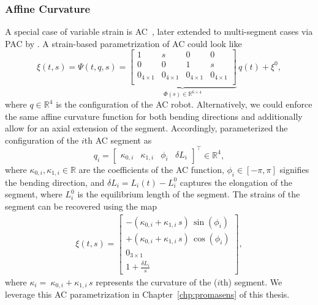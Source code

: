 \subsubsection{Affine Curvature}
A special case of variable strain is \gls{AC}~\citep{della2020soft, stella2022experimental, tiburzio2025model}, later extended to multi-segment cases via \gls{PAC} by \citet{stella2023piecewise}.
A strain-based parametrization of \gls{AC} could look like
\begin{equation}
    \xi(t,s) = \Psi(t,q,s) = \underbrace{\begin{bmatrix}
        1 & s & 0 & 0\\
        0 & 0 & 1 & s\\
        0_{4 \times 1} & 0_{4 \times 1} & 0_{4 \times 1} & 0_{4 \times 1}\\
    \end{bmatrix}}_{\Phi(s) \in \mathbb{R}^{6 \times 4}} \, q(t) + \xi^0,
\end{equation}
where $q \in \mathbb{R}^4$ is the configuration of the \gls{AC} robot.
Alternatively, we could enforce the same affine curvature function for both bending directions and additionally allow for an axial extension of the segment. Accordingly, \citet{stella2023piecewise, baaij2023learning} parameterized the configuration of the $i$th \gls{AC} segment as
\begin{equation}
    q_i = \begin{bmatrix}\kappa_{0,i} & \kappa_{1,i} & \phi_i & \delta L_{i} \end{bmatrix}^{\top} \in \mathbb{R}^4,    
\end{equation}
where $\kappa_{0,i}, \kappa_{1,i} \in \mathbb{R}$ are the coefficients of the \gls{AC} function, $\phi_i \in [-\pi, \pi]$ signifies the bending direction, and $\delta L_i = L_i(t) - L_i^0$ captures the elongation of the segment, where $L_i^0$ is the equilibrium length of the segment.
The strains of the segment can be recovered using the map
\begin{equation}
\begin{split}
    \xi(t,s) = \begin{bmatrix}
        - \left ( \kappa_{0,i} + \kappa_{1,i} \, s \right ) \, \sin(\phi_i)\\
        +\left ( \kappa_{0,i} + \kappa_{1,i} \, s \right ) \, \cos(\phi_i)\\
        0_{3\times1}\\
        1 + \frac{\delta L_i}{s}
    \end{bmatrix},
\end{split}
\end{equation}
where $\kappa_i = \: \kappa_{0,i} + \kappa_{1,i} \, s$ represents the curvature of the ($i$th) segment.
We leverage this \gls{AC} parametrization in Chapter~\ref{chp:promasens} of this thesis.